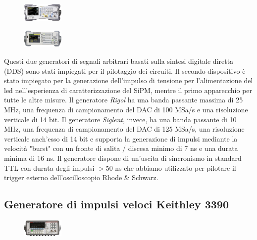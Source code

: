 \documentclass[journal]{IEEEtran}
\begin{document}
\begin{figure}[h!]
  \centering
  \includegraphics[width=0.18\textwidth]{lab-reports/Schematics-and-graphics/RIGOL Gen.png}
\end{figure}

\begin{figure}[h!]
  \centering
  \includegraphics[width=0.18\textwidth]{lab-reports/Schematics-and-graphics/SIGLENT Gen.png}
\end{figure}

Questi due generatori di segnali arbitrari basati sulla sintesi digitale diretta (DDS) sono stati impiegati per il pilotaggio dei circuiti. Il secondo dispositivo è stato impiegato per la generazione dell'impulso di tensione per l'alimentazione del led nell'esperienza di caratterizzazione del SiPM, mentre il primo apparecchio per tutte le altre misure. Il generatore \textit{Rigol} ha una banda passante massima di 25 MHz, una frequenza di campionamento del DAC di 100 MSa/s e una risoluzione verticale di 14 bit. Il generatore \textit{Siglent}, invece, ha una banda passante di 10 MHz, una frequenza di campionamento del DAC di 125 MSa/s, una risoluzione verticale anch'esso di 14 bit e supporta la generazione di impulsi mediante la velocità "burst" con un fronte di salita / discesa minimo di 7 ns e una durata minima di 16 ns. Il generatore dispone di un'uscita di sincronismo in standard TTL con durata degli impulsi $> 50$ ns che abbiamo utilizzato per pilotare il trigger esterno dell'oscilloscopio Rhode \& Schwarz. \cite{E} \cite{G}

\subsection{\textbf{Generatore di impulsi veloci Keithley 3390}}

\begin{figure}[h!]
  \centering
  \includegraphics[width=0.18\textwidth]{lab-reports/Schematics-and-graphics/KEIT Gen.png}
\end{figure}
\end{document}
